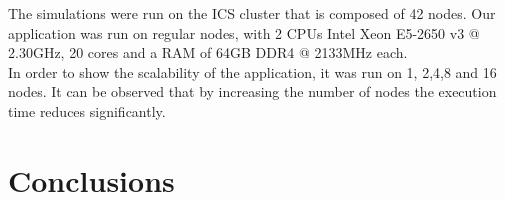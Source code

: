 \documentclass{usiinftr}
\begin{document}
The simulations were run on the ICS cluster that is composed of 42 nodes. Our application was run on regular nodes, with 2 CPUs Intel Xeon E5-2650 v3 @ 2.30GHz, 20 cores and a RAM of 64GB DDR4 @ 2133MHz each. \\
In order to show the scalability of the application, it was run on 1, 2,4,8 and 16 nodes. It can be observed that by increasing the number of nodes the execution time reduces significantly. 

\section{Conclusions}


  
\end{document}
